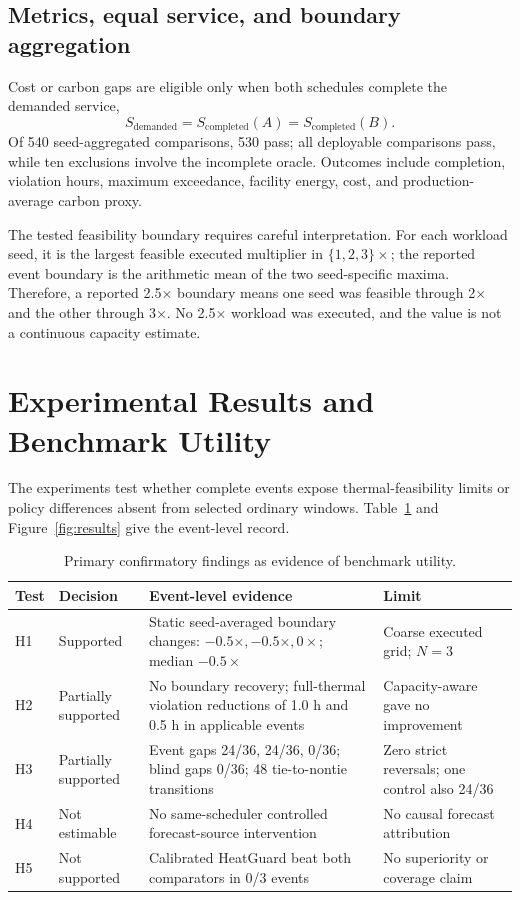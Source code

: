 \documentclass[pdflatex,sn-mathphys-num]{sn-jnl}
\begin{document}
\subsection{Metrics, equal service, and boundary aggregation}

Cost or carbon gaps are eligible only when both schedules complete the demanded service,
\begin{equation}
S_{\mathrm{demanded}}=S_{\mathrm{completed}}(A)=S_{\mathrm{completed}}(B).
\end{equation}
Of 540 seed-aggregated comparisons, 530 pass; all deployable comparisons pass, while ten exclusions involve the incomplete oracle. Outcomes include completion, violation hours, maximum exceedance, facility energy, cost, and production-average carbon proxy.

The tested feasibility boundary requires careful interpretation. For each workload seed, it is the largest feasible executed multiplier in $\{1,2,3\}\times$; the reported event boundary is the arithmetic mean of the two seed-specific maxima. Therefore, a reported 2.5$\times$ boundary means one seed was feasible through 2$\times$ and the other through 3$\times$. No 2.5$\times$ workload was executed, and the value is not a continuous capacity estimate.

\section{Experimental Results and Benchmark Utility}\label{sec:results}

The experiments test whether complete events expose thermal-feasibility limits or policy differences absent from selected ordinary windows. Table~\ref{tab:results} and Figure~\ref{fig:results} give the event-level record.

\begin{table}[t]
\caption{Primary confirmatory findings as evidence of benchmark utility.}
\label{tab:results}
\small
\begin{tabular}{@{}p{}p{}p{}p{}@{}}
\toprule
\textbf{Test} & \textbf{Decision} & \textbf{Event-level evidence} & \textbf{Limit} \\
\midrule
H1 & Supported & Static seed-averaged boundary changes: $-0.5\times,-0.5\times,0\times$; median $-0.5\times$ & Coarse executed grid; $N=3$ \\
H2 & Partially supported & No boundary recovery; full-thermal violation reductions of 1.0 h and 0.5 h in applicable events & Capacity-aware gave no improvement \\
H3 & Partially supported & Event gaps 24/36, 24/36, 0/36; blind gaps 0/36; 48 tie-to-nontie transitions & Zero strict reversals; one control also 24/36 \\
H4 & Not estimable & No same-scheduler controlled forecast-source intervention & No causal forecast attribution \\
H5 & Not supported & Calibrated HeatGuard beat both comparators in 0/3 events & No superiority or coverage claim \\
\bottomrule
\end{tabular}
\end{table}
\end{document}
